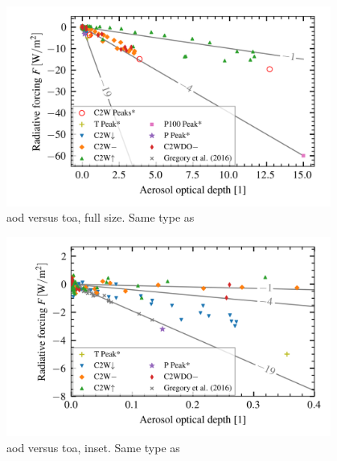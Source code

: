 \documentclass{ametsocV5}
\begin{document}
\begin{figure}
  \begin{center}
    \includegraphics[width=0.95\textwidth]{figures/aod_vs_toa_avg_full.png}
  \end{center}
  \caption{\acrshort{aod} versus \acrshort{toa}, full size. Same type as \citet{gregory2016}}
  \label{fig:aod_vs_toa_full}
\end{figure}

\begin{figure}
  \begin{center}
    \includegraphics[width=0.95\textwidth]{figures/aod_vs_toa_avg_inset.png}
  \end{center}
  \caption{\acrshort{aod} versus \acrshort{toa}, inset. Same type as \citet{gregory2016}}
  \label{fig:aod_vs_toa_inset}
\end{figure}
\end{document}

